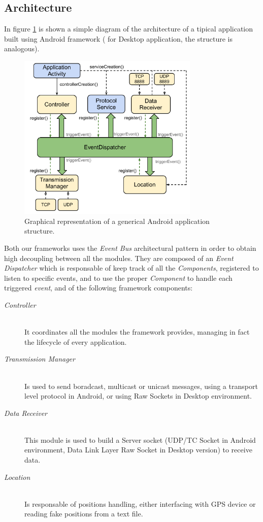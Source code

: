 \subsection{Architecture}

In figure \ref{fig:architecture} is shown a simple diagram of the architecture of a tipical application built using Android framework ( for Desktop application, the structure is analogous).

\begin{figure}[htbp]
	\centering
	\includegraphics[trim = 10mm 0mm 0mm 0mm,width=3.4in]{imgs/components_architecture.pdf}
	\caption{Graphical representation of a generical Android application structure.}
	\label{fig:architecture}
\end{figure}

Both our frameworks uses the \textit{Event Bus} architectural pattern in order to obtain high decoupling between all the modules. 
They are composed of an \emph{Event Dispatcher} which is responsable of keep track of all the \emph{Components}, registered to listen to specific events, and to use the proper \emph{Component} to handle each triggered \emph{event}, and of the following framework components:
\begin{description}
	\item[\emph{Controller}]  \hfill \\
		It coordinates all the modules the framework provides, managing in fact the lifecycle of every application.
	\item[\emph{Transmission Manager}]  \hfill \\
		Is used to send boradcast, multicast or unicast messages, using a transport level protocol in Android, or using Raw Sockets in Desktop environment.
	\item[\emph{Data Receiver}] \hfill \\
		This module is used to build a Server socket (UDP/TC Socket in Android environment, Data Link Layer Raw Socket in Desktop version) to receive data.
	\item[\emph{Location}] \hfill \\
		Is responsable of positions handling, either interfacing with GPS device or reading fake positions from a text file.  
\end{description}

